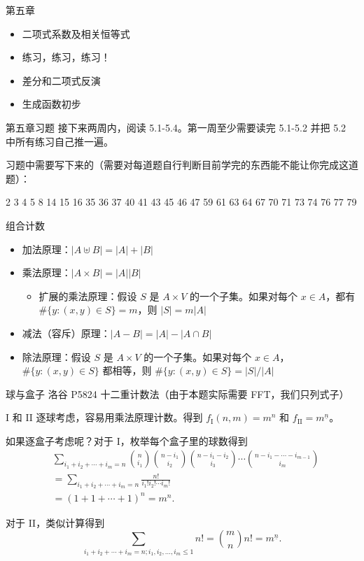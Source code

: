 
\begin{frame}{第五章}
    \begin{itemize}
        \item 二项式系数及相关恒等式
        \item 练习，练习，练习！
        \item 差分和二项式反演
        \item 生成函数初步
    \end{itemize}
\end{frame}
\begin{frame}{第五章习题}
    接下来两周内，阅读 5.1-5.4。第一周至少需要读完 5.1-5.2 并把 5.2 中所有练习自己推一遍。
    
    习题中需要写下来的（需要对每道题自行判断目前学完的东西能不能让你完成这道题）：
    
    2 3 4 5 8 14 15 16 35 36 37 40 41 43 45 46 47 59 61 63 64 67 70 71 73 74 76 77 79
    
\end{frame}
\begin{frame}{组合计数}
    \begin{itemize}
        \item 加法原理：$|A\uplus B|=|A|+|B|$
        \item 乘法原理：$|A\times B|=|A||B|$
        \begin{itemize}
            \item 扩展的乘法原理：假设 $S$ 是 $A\times V$ 的一个子集。如果对每个 $x\in A$，都有 $\#\{y:(x,y)\in S\}=m$，则 $|S|=m|A|$
        \end{itemize}
        \item 减法（容斥）原理：$|A-B|=|A|-|A\cap B|$
        \item 除法原理：假设 $S$ 是 $A\times V$ 的一个子集。如果对每个 $x\in A$，$\#\{y:(x,y)\in S\}$ 都相等，则 $\#\{y:(x,y)\in S\}=|S|/|A|$
    \end{itemize}
\end{frame}
\begin{frame}{球与盒子}
    洛谷 P5824 十二重计数法（由于本题实际需要 FFT，我们只列式子）
\end{frame}
\begin{frame}{I 和 II}
    逐球考虑，容易用乘法原理计数。得到 $f_{\mathrm{I}}(n,m)=m^n$ 和 $f_{\mathrm{II}}=m^{\underline n}$。

    如果逐盒子考虑呢？对于 I，枚举每个盒子里的球数得到
    $$
    \begin{aligned}
    &\sum_{i_1+i_2+\cdots+i_m=n}\binom{n}{i_1}\binom{n-i_1}{i_2}\binom{n-i_1-i_2}{i_3}\cdots\binom{n-i_1-\cdots-i_{m-1}}{i_m}\\
    &=\sum_{i_1+i_2+\cdots+i_m=n}\frac{n!}{i_1!i_2!\cdots i_m!}\\
    &=(1+1+\cdots+1)^n=m^n.
    \end{aligned}
    $$

    对于 II，类似计算得到 
    $$
    \sum_{i_1+i_2+\cdots+i_m=n;i_1,i_2,\ldots,i_m\le 1}n!=\binom{m}{n}n!=m^{\underline{n}}.
    $$
\end{frame}
